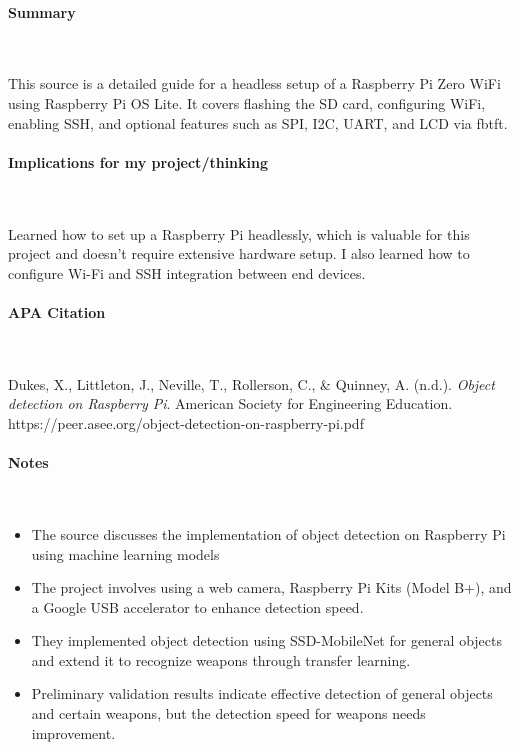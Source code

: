 \vspace*{-0.5cm}
\paragraph{Summary} \

This source is a detailed guide for a headless setup of a Raspberry Pi Zero WiFi using Raspberry Pi OS Lite. It covers flashing the SD card, configuring WiFi, enabling SSH, and optional features such as SPI, I2C, UART, and LCD via fbtft.

\vspace*{-0.5cm}
\paragraph{Implications for my project/thinking} \

Learned how to set up a Raspberry Pi headlessly, which is valuable for this project and doesn't require extensive hardware setup. I also learned how to configure Wi-Fi and SSH integration between end devices.

\newpage

\vspace*{-0.5cm}
\paragraph{APA Citation} \

\begin{hangparas}{.25in}{1}
Dukes, X., Littleton, J., Neville, T., Rollerson, C., \& Quinney, A. (n.d.). \textit{Object detection on Raspberry Pi}. American Society for Engineering Education. https://peer.asee.org/object-detection-on-raspberry-pi.pdf
\end{hangparas}

\vspace*{-0.5cm}
\paragraph{Notes} \

\begin{itemize}
    \item The source discusses the implementation of object detection on Raspberry Pi using machine learning models
    \item The project involves using a web camera, Raspberry Pi Kits (Model B+), and a Google USB accelerator to enhance detection speed.
    \item They implemented object detection using SSD-MobileNet for general objects and extend it to recognize weapons through transfer learning.
    \item Preliminary validation results indicate effective detection of general objects and certain weapons, but the detection speed for weapons needs improvement.
\end{itemize}
    
